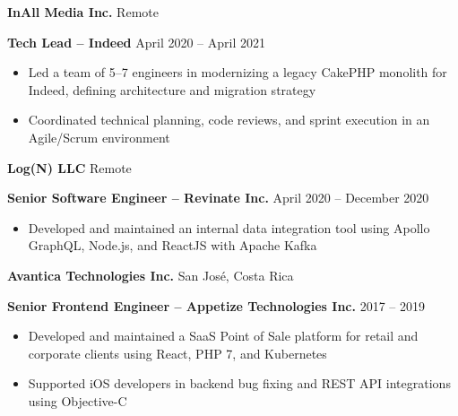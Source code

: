 \documentclass[11pt]{article}
\begin{document}
\vspace{12pt}

\textbf{InAll Media Inc.} \hfill Remote

\textbf{Tech Lead -- Indeed} \hfill April 2020 -- April 2021
\begin{itemize}[noitemsep, topsep=0pt, partopsep=0pt, parsep=0pt]
    \item Led a team of 5--7 engineers in modernizing a legacy CakePHP monolith for Indeed, defining architecture and migration strategy
    \item Coordinated technical planning, code reviews, and sprint execution in an Agile/Scrum environment
\end{itemize}

\vspace{12pt}

\textbf{Log(N) LLC} \hfill Remote

\textbf{Senior Software Engineer -- Revinate Inc.} \hfill April 2020 -- December 2020
\begin{itemize}[noitemsep, topsep=0pt, partopsep=0pt, parsep=0pt]
    \item Developed and maintained an internal data integration tool using Apollo GraphQL, Node.js, and ReactJS with Apache Kafka
\end{itemize}

\vspace{12pt}

\textbf{Avantica Technologies Inc.} \hfill San Jos\'e, Costa Rica

\textbf{Senior Frontend Engineer -- Appetize Technologies Inc.} \hfill 2017 -- 2019
\begin{itemize}[noitemsep, topsep=0pt, partopsep=0pt, parsep=0pt]
    \item Developed and maintained a SaaS Point of Sale platform for retail and corporate clients using React, PHP 7, and Kubernetes
    \item Supported iOS developers in backend bug fixing and REST API integrations using Objective-C
\end{itemize}

\vspace{12pt}
\end{document}
